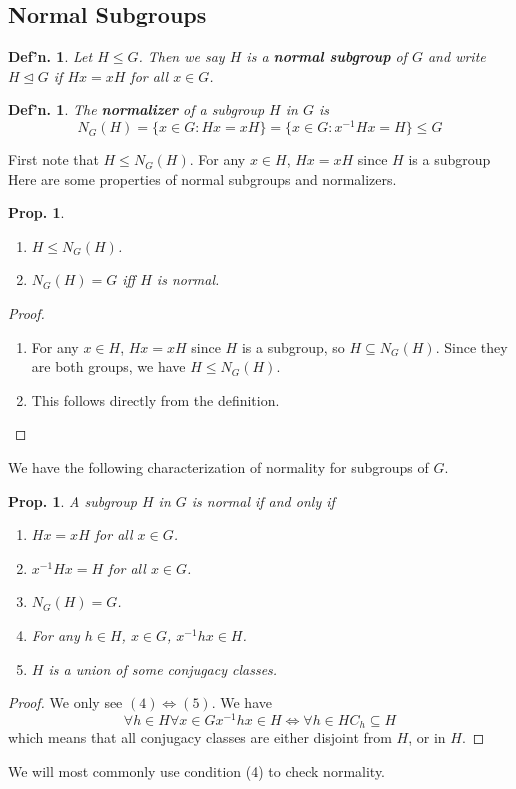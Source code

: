 \documentclass[12pt, a4paper]{book}
\newtheorem{definition}[theorem]{Def'n.}
\newtheorem{proposition}[theorem]{Prop.}
\theoremstyle{nonumberplain}
\newtheorem{proof}{Proof}
\begin{document}
\subsection{Normal Subgroups}
\begin{definition}
    Let $H\leq G$.
    Then we say $H$ is a \textbf{normal subgroup} of $G$ and write $H\trianglelefteq G$ if $Hx=xH$ for all $x\in G$.
\end{definition}
\begin{definition}
    The \textbf{normalizer} of a subgroup $H$ in $G$ is
    \[N_G(H)=\{x\in G:Hx=xH\}=\{x\in G:x^{-1}Hx=H\}\leq G\]
\end{definition}
First note that $H\leq N_G(H)$.
For any $x\in H$, $Hx=xH$ since $H$ is a subgroup
Here are some properties of normal subgroups and normalizers.
\begin{proposition}
    \begin{enumerate}
        \item $H\leq N_G(H)$.
        \item $N_G(H)=G$ iff $H$ is normal.
    \end{enumerate}
\end{proposition}
\begin{proof}
    \begin{enumerate}
        \item For any $x\in H$, $Hx=xH$ since $H$ is a subgroup, so $H\subseteq N_G(H)$.
            Since they are both groups, we have $H\leq N_G(H)$.
        \item This follows directly from the definition.
    \end{enumerate}
\end{proof}
We have the following characterization of normality for subgroups of $G$.
\begin{proposition}
    A subgroup $H$ in $G$ is normal if and only if
    \begin{enumerate}
        \item $Hx=xH$ for all $x\in G$.
        \item $x^{-1}Hx=H$ for all $x\in G$.
        \item $N_G(H)=G$.
        \item For any $h\in H$, $x\in G$, $x^{-1}hx\in H$.
        \item $H$ is a union of some conjugacy classes.
    \end{enumerate}
\end{proposition}
\begin{proof}
    We only see $(4)\Leftrightarrow (5)$.
    We have
    \[\forall h\in H\forall x\in G x^{-1}hx\in H\Leftrightarrow\forall h\in H C_h\subseteq H\]
    which means that all conjugacy classes are either disjoint from $H$, or in $H$.
\end{proof}
We will most commonly use condition (4) to check normality.
\end{document}
